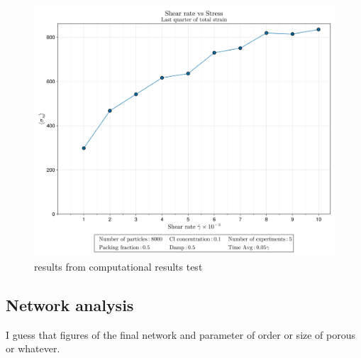 \begin{figure}[ht!]
    \centering
    \includegraphics[width=\textwidth]{figs/ComputaitonalResults/CL10/shearRate.png}
    \caption{results from computational results test}
\end{figure}


\subsection{Network analysis}

I guess that figures of the final network and parameter of order or size of porous or whatever.

